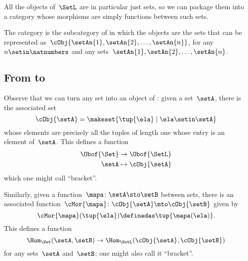 
All the objects of~$\SetL$ are in particular just sets, so we can package them into a category whose morphisms are simply functions between such sets.

\begin{ctdefinition}[\SetL]
    The category \SetL is the subcategory of \Set in which the objects are the sets that can be represented as~$\cObj{\setAn{1}, \setAn{2}, \ldots, \setAn{n}}$, for any~$n \setin \natnumbers$ and any sets~$\setAn{1}, \setAn{2}, \ldots, \setAn{n}$.
\end{ctdefinition}
\subsection{From \Set to~\SetL}

Observe that we can turn any set into an object of \SetL: given a set~$\setA$, there is the associated set
\begin{equation}
    \cObj{\setA} = \makeset{ \tup{\ela} \mid \ela \setin \setA }
\end{equation}
whose elements are precisely all the tuples of length one whose entry is an element of~$\setA$.
This defines a function
\begin{equation}
    \begin{aligned}
        \Obof{\Set} & \to \Obof{\SetL} \\
        \setA      & \mapsto \cObj{\setA}
    \end{aligned}
\end{equation}
which one might call ``bracket''.

Similarly, given a function~$\mapa \colon \setA \sto \setB$ between sets, there is an associated function~$\cMor{ \mapa }\colon \cObj{\setA} \mto \cObj{\setB}$ given by
\begin{equation}
    \cMor{ \mapa } ( \tup{ \ela }) \definedas \tup{\mapa(\ela)}.
\end{equation}
This defines a function
\begin{equation}
    \Hom_{\Set}(\setA,\setB) \to \Hom_{\SetL}(\cObj{\setA},\cObj{\setB})
\end{equation}
for any sets~$\setA$ and~$\setB$; one might also call it ``bracket''.

